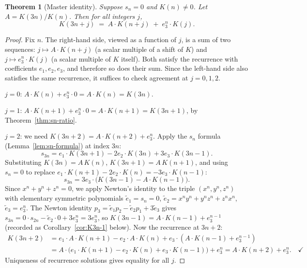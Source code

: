 \documentclass[12pt]{article}
\newtheorem{theorem}{Theorem}[section]
\theoremstyle{definition}
\begin{document}
	\begin{theorem}[Master identity]
		\label{thm:master}
		Suppose $s_n = 0$ and $K(n) \neq 0$.  Let $A = K(3n)/K(n)$.  Then for all integers $j$,
		\[
		K(3n+j) \;=\; A \cdot K(n+j) \;+\; e_3^n \cdot K(j).
		\]
	\end{theorem}
	\begin{proof}
		Fix $n$.  The right-hand side, viewed as a function of $j$, is a sum
		of two sequences: $j \mapsto A \cdot K(n+j)$ (a scalar multiple of a shift
		of $K$) and $j \mapsto e_3^n \cdot K(j)$ (a scalar multiple of $K$ itself).
		Both satisfy the recurrence with coefficients $e_1, e_2, e_3$, and
		therefore so does their sum.  Since the left-hand side also satisfies
		the same recurrence, it suffices to check agreement at $j = 0, 1, 2$.
		
		\smallskip\noindent
		$j = 0$: $A \cdot K(n) + e_3^n \cdot 0 = A \cdot K(n) = K(3n)$. \checkmark
		
		\smallskip\noindent
		$j = 1$: $A \cdot K(n+1) + e_3^n \cdot 0 = A \cdot K(n+1) = K(3n+1)$,
		by Theorem~\ref{thm:sn-ratio}. \checkmark
		
		\smallskip\noindent
		$j = 2$: we need $K(3n+2) = A \cdot K(n+2) + e_3^n$.
		Apply the $s_n$ formula (Lemma~\ref{lem:sn-formula}) at index $3n$:
		\[
		s_{3n} = e_1 \cdot K(3n+1) - 2e_2 \cdot K(3n) + 3e_3 \cdot K(3n-1).
		\]
		Substituting $K(3n) = A\,K(n)$, $K(3n+1) = A\,K(n+1)$, and using
		$s_n = 0$ to replace $e_1 \cdot K(n+1) - 2e_2 \cdot K(n) = -3e_3 \cdot K(n-1)$:
		\[
		s_{3n} = 3e_3 \cdot \bigl(K(3n-1) - A \cdot K(n-1)\bigr).
		\]
		Since $x^n + y^n + z^n = 0$, we apply Newton's identity to the triple
		$(x^n, y^n, z^n)$ with elementary symmetric polynomials $\tilde{e}_1 = s_n = 0$,
		$\tilde{e}_2 = x^ny^n+y^nz^n+z^nx^n$, $\tilde{e}_3 = e_3^n$.  The Newton identity
		$p_3 = \tilde{e}_1 p_2 - \tilde{e}_2 p_1 + 3\tilde{e}_3$ gives
		$s_{3n} = 0 \cdot s_{2n} - \tilde{e}_2 \cdot 0 + 3e_3^n = 3e_3^n$, so
		$K(3n-1) = A \cdot K(n-1) + e_3^{n-1}$ (recorded as Corollary~\ref{cor:K3n-1} below).  Now the recurrence at $3n+2$:
		\begin{align*}
			K(3n+2)
			&= e_1 \cdot A \cdot K(n+1) - e_2 \cdot A \cdot K(n)
			+ e_3 \cdot (A \cdot K(n-1) + e_3^{n-1}) \\
			&= A \cdot \bigl(e_1 \cdot K(n+1) - e_2 \cdot K(n) + e_3 \cdot K(n-1)\bigr) + e_3^n
			= A \cdot K(n+2) + e_3^n. \quad\checkmark
		\end{align*}
		Uniqueness of recurrence solutions gives equality for all $j$.
	\end{proof}
	
\end{document}
